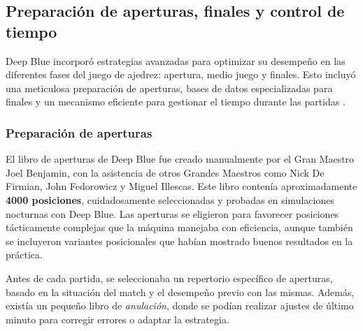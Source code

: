 \documentclass[12pt,a4paper]{article}
\begin{document}
\subsection{Preparación de aperturas, finales y control de tiempo}

Deep Blue incorporó estrategias avanzadas para optimizar su desempeño en las diferentes fases del juego de ajedrez: apertura, medio juego y finales. Esto incluyó una meticulosa preparación de aperturas, bases de datos especializadas para finales y un mecanismo eficiente para gestionar el tiempo durante las partidas \cite{campbell2002deepblue}.

\subsubsection*{Preparación de aperturas}
El libro de aperturas de Deep Blue fue creado manualmente por el Gran Maestro Joel Benjamin, con la asistencia de otros Grandes Maestros como Nick De Firmian, John Fedorowicz y Miguel Illescas. Este libro contenía aproximadamente \textbf{4000 posiciones}, cuidadosamente seleccionadas y probadas en simulaciones nocturnas con Deep Blue. Las aperturas se eligieron para favorecer posiciones tácticamente complejas que la máquina manejaba con eficiencia, aunque también se incluyeron variantes posicionales que habían mostrado buenos resultados en la práctica.

Antes de cada partida, se seleccionaba un repertorio específico de aperturas, basado en la situación del match y el desempeño previo con las mismas. Además, existía un pequeño libro de \textit{anulación}, donde se podían realizar ajustes de último minuto para corregir errores o adaptar la estrategia.
\end{document}
